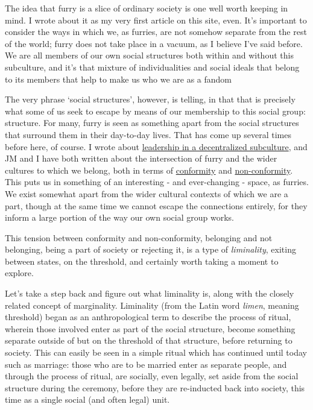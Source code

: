 The idea that furry is a slice of ordinary society is one well worth
keeping in mind. I wrote about it as my very first article on this site,
even. It's important to consider the ways in which we, as furries, are
not somehow separate from the rest of the world; furry does not take
place in a vacuum, as I believe I've said before. We are all members of
our own social structures both within and without this subculture, and
it's that mixture of individualities and social ideals that belong to
its members that help to make us who we are as a fandom

The very phrase `social structures', however, is telling, in that that
is precisely what some of us seek to escape by means of our membership
to this social group: structure. For many, furry is seen as something
apart from the social structures that surround them in their day-to-day
lives. That has come up several times before here, of course. I wrote
about
\href{http://adjectivespecies.com/2013/03/20/leadership-in-a-decentralized-subculture/}{leadership
in a decentralized subculture}, and JM and I have both written about the
intersection of furry and the wider cultures to which we belong, both in
terms of
\href{http://adjectivespecies.com/2013/06/17/an-argument-for-conformity/}{conformity}
and
\href{http://adjectivespecies.com/2013/06/19/an-argument-for-non-conformity/}{non-conformity}.
This puts us in something of an interesting - and ever-changing - space,
as furries. We exist somewhat apart from the wider cultural contexts of
which we are a part, though at the same time we cannot escape the
connections entirely, for they inform a large portion of the way our own
social group works.

This tension between conformity and non-conformity, belonging and not
belonging, being a part of society or rejecting it, is a type of
\emph{liminality}, exiting between states, on the threshold, and
certainly worth taking a moment to explore.

Let's take a step back and figure out what liminality is, along with the
closely related concept of marginality. Liminality (from the Latin word
\emph{limen}, meaning threshold) began as an anthropological term to
describe the process of ritual, wherein those involved enter as part of
the social structure, become something separate outside of but on the
threshold of that structure, before returning to society. This can
easily be seen in a simple ritual which has continued until today such
as marriage: those who are to be married enter as separate people, and
through the process of ritual, are socially, even legally, set aside
from the social structure during the ceremony, before they are
re-inducted back into society, this time as a single social (and often
legal) unit.

